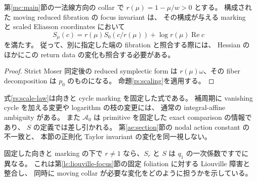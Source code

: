 \begin{corollary}
\label{rs:collar}
第\ref{mc:main}節の一法線方向の collar で
$r(\mu)=1-\mu/w>0$ とする。
構成された moving reduced fibration の focus invariant は、
その構成が与える marking と scaled Eliasson coordinates において
\[
 S_\mu(c)=r(\mu)S_0(c/r(\mu))+
              \log r(\mu)\operatorname{Re}c
\]
を満たす。
従って、別に指定した端の fibration と照合する際には、
Hessian のほかにこの return data の変化も照合する必要がある。
\end{corollary}

\begin{proof}
Strict Moser 同定後の reduced symplectic form は
$r(\mu)\omega$、その fiber decomposition は $p_0$ のものになる。
命題\ref{rs:scaling}を適用する。
\end{proof}

\begin{remark}
式\eqref{rs:scale-law}は向きと cycle marking を固定した式である。
補周期に vanishing cycle を加える変更や logarithm の枝の変更には、
通常の integral-affine ambiguity がある。
また $\mathcal A_0$ は primitive を固定した exact comparison の情報であり、
$S$ の定義では差し引かれる。
第\ref{ae:section}節の nodal action constant の不一致と、
本節の正則化 Taylor invariant の変化を同一視しない。

固定した向きと marking の下で $r\ne1$ なら、$S_r$ と $S$ は
$q_1$ の一次係数ですでに異なる。
これは第\ref{lc:liouville-focus}節の固定 foliation に対する Liouville 障害と整合し、
同時に moving collar が必要な変化をどのように担うかを示している。
\end{remark}
